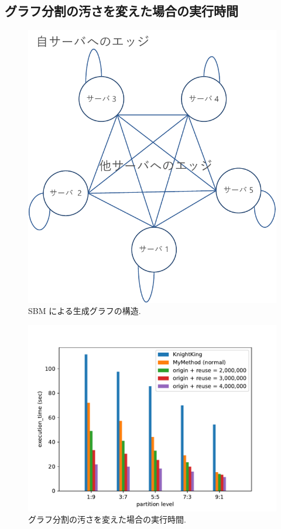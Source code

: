 \subsection{グラフ分割の汚さを変えた場合の実行時間}\label{グラフ分割の汚さを変えた場合の実行時間}

\begin{figure}[t]
    \centering
    \includegraphics[scale=0.7]{figure/sbm.pdf}
    \caption{SBM による生成グラフの構造.}
    \label{SBM による生成グラフの構造}
\end{figure}

\begin{figure}[t!]
    \centering
    \includegraphics[scale=0.9]{figure/Kn_vs_AR_partition_level.pdf}
    \caption{グラフ分割の汚さを変えた場合の実行時間.}
    \label{グラフ分割の汚さを変えた場合の実行時間の結果}
\end{figure}

